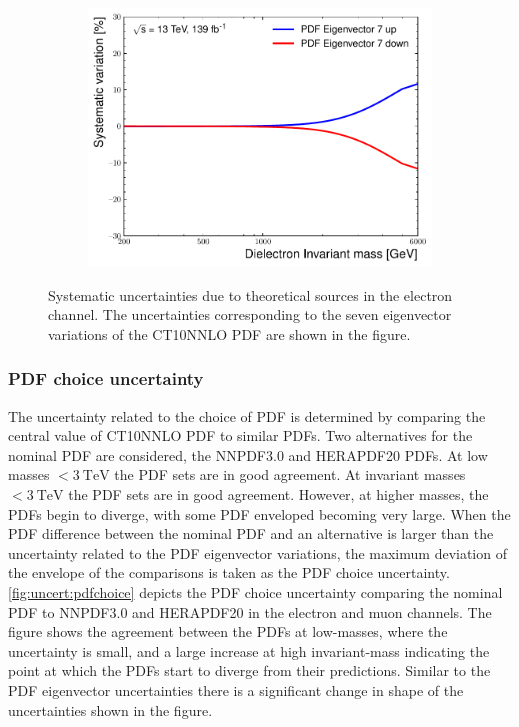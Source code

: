 \begin{figure}[h!]
\begin{subfigure}[b]{0.42\textwidth}
        \includegraphics[width=\textwidth]{figures/analysis/datamc/Uncertainties/theory/ee/backgroundTemplate_KF_PDF_EV7.pdf}
        \label{fig:uncert:eepdfvar7}
    \end{subfigure}
    \caption{Systematic uncertainties due to theoretical sources in the electron channel. The uncertainties corresponding to the seven eigenvector variations of the CT10NNLO PDF are shown in the figure.}
    \label{fig:ucnert:eepdfvar}
\end{figure}

\subsubsection{PDF choice uncertainty}
The uncertainty related to the choice of PDF is determined by comparing the central value of CT10NNLO PDF to similar PDFs. Two alternatives for the nominal PDF are considered, the NNPDF3.0 and HERAPDF20 PDFs. At low masses $< \SI{3}{\tera\electronvolt}$ the PDF sets are in good agreement. At invariant masses $< \SI{3}{\tera\electronvolt}$ the PDF sets are in good agreement. However, at higher masses, the PDFs begin to diverge, with some PDF enveloped becoming very large. When the PDF difference between the nominal PDF and an alternative is larger than the uncertainty related to the PDF eigenvector variations, the maximum deviation of the envelope of the comparisons is taken as the PDF choice uncertainty. \cref{fig:uncert:pdfchoice} depicts the PDF choice uncertainty comparing the nominal PDF to NNPDF3.0 and HERAPDF20 in the electron and muon channels. The figure shows the agreement between the PDFs at low-masses, where the uncertainty is small, and a large increase at high invariant-mass indicating the point at which the PDFs start to diverge from their predictions. Similar to the PDF eigenvector uncertainties there is a significant change in shape of the uncertainties shown in the figure.

